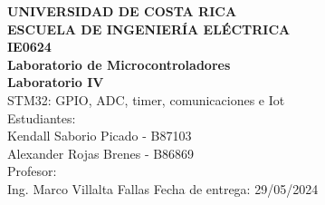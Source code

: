 \documentclass[12pt,letterpaper]{article}
\begin{document}
\begin{titlepage}
\begin{center}
\textbf{UNIVERSIDAD DE COSTA RICA}\\ 
\vspace{6mm}
\textbf{ESCUELA DE INGENIERÍA ELÉCTRICA}\\
\vspace{3cm}
\textbf{IE0624}\\
\textbf{Laboratorio de Microcontroladores}\\
\vspace{3cm}
\textbf{Laboratorio IV}\\
\vspace{0.5cm}
STM32: GPIO, ADC, timer, comunicaciones e Iot\\
\vspace{3cm}
Estudiantes:\\
Kendall Saborio Picado - B87103\\
Alexander Rojas Brenes - B86869\\
\vspace{1.5cm}
Profesor:\\
Ing. Marco Villalta Fallas
\vfill
Fecha de entrega: 29/05/2024
\end{center}
\end{titlepage}

\tableofcontents












\end{document}
